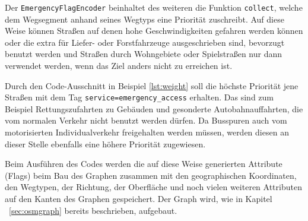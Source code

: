 Der \texttt{EmergencyFlagEncoder} beinhaltet des weiteren die Funktion \texttt{collect}, welche dem Wegsegment anhand seines Wegtyps eine Priorität zuschreibt.
Auf diese Weise können Straßen auf denen hohe Geschwindigkeiten gefahren werden können oder die extra für Liefer- oder Forstfahrzeuge ausgeschrieben sind, bevorzugt benutzt werden und Straßen durch Wohngebiete oder Spielstraßen nur dann verwendet werden, wenn das Ziel anders nicht zu erreichen ist.


Durch den Code-Ausschnitt in Beispiel \ref{lst:weight} soll die höchste Priorität jene Straßen mit dem Tag \texttt{service=emergency\_access} erhalten.
Das sind zum Beispiel Rettungszufahrten zu Gebäuden und gesonderte Autobahnauffahrten, die vom normalen Verkehr nicht benutzt werden dürfen.
Da Busspuren auch vom motorisierten Individualverkehr freigehalten werden müssen, werden diesen an dieser Stelle ebenfalls eine höhere Priorität zugewiesen.

Beim Ausführen des Codes werden die auf diese Weise generierten Attribute (Flags) beim Bau des Graphen zusammen mit den geographischen Koordinaten, den Wegtypen, der Richtung, der Oberfläche und noch vielen weiteren Attributen auf den Kanten des Graphen gespeichert.
Der Graph wird, wie in Kapitel ~\ref{sec:osmgraph} bereits beschrieben, aufgebaut.


